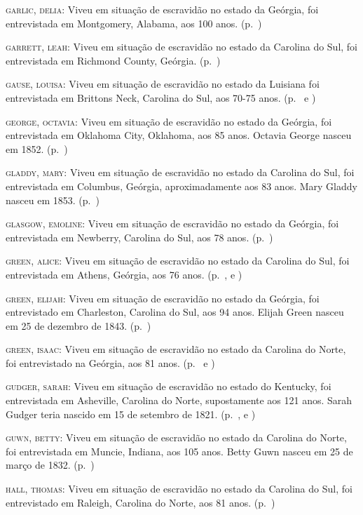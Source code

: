 \begin{Parskip}
\textsc{garlic, delia:} Viveu em situação de escravidão no estado da Geórgia, foi entrevistada
em Montgomery, Alabama, aos 100 anos. (p.~\pageref{ref101})

\textsc{garrett, leah:} Viveu em situação de escravidão no estado da Carolina do Sul, foi
entrevistada em Richmond County, Geórgia. (p.~\pageref{ref102})

\textsc{gause, louisa:} Viveu em situação de escravidão no estado da Luisiana foi entrevistada
em Brittons Neck, Carolina do Sul, aos 70-75 anos. (p.~\pageref{ref103} e \pageref{ref104})

\textsc{george, octavia:} Viveu em situação de escravidão no estado da Geórgia, foi entrevistada
em Oklahoma City, Oklahoma, aos 85 anos. Octavia George nasceu em 1852. (p.~\pageref{ref105})

\textsc{gladdy, mary:} Viveu em situação de escravidão no estado da Carolina do Sul, foi
entrevistada em Columbus, Geórgia, aproximadamente aos 83 anos. Mary
Gladdy nasceu em 1853. (p.~\pageref{ref106})

\textsc{glasgow, emoline:} Viveu em situação de escravidão no estado da Geórgia, foi
entrevistada em Newberry, Carolina do Sul, aos 78 anos. (p.~\pageref{ref107})

\textsc{green, alice:} Viveu em situação de escravidão no estado da Carolina do Sul, foi
entrevistada em Athens, Geórgia, aos 76 anos. (p.~\pageref{ref108}, \pageref{ref109} e \pageref{ref110})

\textsc{green, elijah:} Viveu em situação de escravidão no estado da Geórgia, foi entrevistado
em Charleston, Carolina do Sul, aos 94 anos. Elijah Green nasceu em 25
de dezembro de 1843. (p.~\pageref{ref111})

\textsc{green, isaac:} Viveu em situação de escravidão no estado da Carolina do Norte, foi
entrevistado na Geórgia, aos 81 anos. (p.~\pageref{ref112} e \pageref{ref113})

\textsc{gudger, sarah:} Viveu em situação de escravidão no estado do Kentucky, foi entrevistada
em Asheville, Carolina do Norte, supostamente aos 121 anos. Sarah Gudger
teria nascido em 15 de setembro de 1821. (p.~\pageref{ref114}, \pageref{ref115} e \pageref{ref116})

\textsc{guwn, betty:} Viveu em situação de escravidão no estado da Carolina do Norte, foi
entrevistada em Muncie, Indiana, aos 105 anos. Betty Guwn nasceu em 25
de março de 1832. (p.~\pageref{ref117})

\textsc{hall, thomas:} Viveu em situação de escravidão no estado da Carolina do Sul, foi
entrevistado em Raleigh, Carolina do Norte, aos 81 anos. (p.~\pageref{ref118})


\end{Parskip}
